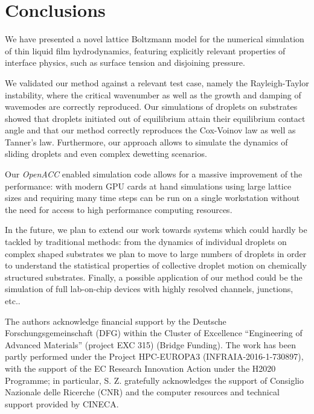 \section{Conclusions}\label{sec:conclusions}
We have presented a novel lattice Boltzmann model for the numerical simulation of thin liquid film 
hydrodynamics, featuring explicitly relevant properties of interface physics, such as surface tension and disjoining pressure.

We validated our method against a relevant test case, namely the Rayleigh-Taylor instability, where the critical wavenumber as well as the growth and damping of wavemodes are correctly reproduced. Our simulations of droplets on substrates showed that droplets initiated out of equilibrium attain their equilibrium contact angle and that our method correctly reproduces the Cox-Voinov law as well as Tanner's law. Furthermore, our approach allows to simulate the dynamics of sliding droplets and even complex dewetting scenarios.

Our \textit{OpenACC} enabled simulation code allows for a massive improvement of the performance: with modern GPU cards at hand simulations using large lattice sizes and requiring many time steps can be run on a single workstation without the need for access to high performance computing resources.

In the future, we plan to extend our work towards systems which could hardly be tackled by traditional methods: from the dynamics of individual droplets on complex shaped substrates we plan to move to large numbers of droplets in order to understand the statistical properties of collective droplet motion on chemically structured substrates. Finally, a possible application of our method could be the simulation of full lab-on-chip devices with highly resolved channels, junctions, etc..
%

\begin{acknowledgements}
The authors acknowledge financial support by the Deutsche 
Forschungsgemeinschaft (DFG) within the Cluster of Excellence ``Engineering of Advanced Materials'' (project EXC 315) (Bridge Funding). The work has been partly performed under the Project HPC-EUROPA3 (INFRAIA-2016-1-730897), with the support of the EC Research Innovation Action under the H2020 Programme; in particular, S. Z. gratefully acknowledges the support of Consiglio Nazionale delle Ricerche (CNR) and the computer resources and technical support provided by CINECA.
\end{acknowledgements}


